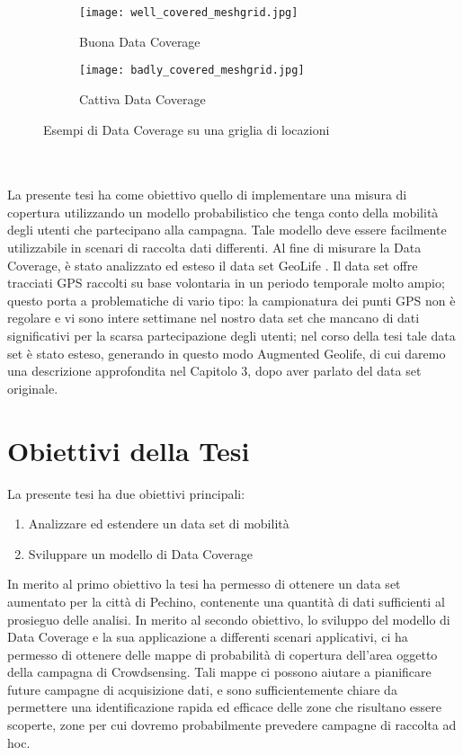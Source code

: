  \begin{figure}[h!]
 	\centering
 	\begin{subfigure}[b]{0.5\linewidth}
 		\texttt{[image: well\_covered\_meshgrid.jpg]}
 		\caption{Buona Data Coverage}
 	\end{subfigure}\hfill
 	\begin{subfigure}[b]{0.5\linewidth}
 		\texttt{[image: badly\_covered\_meshgrid.jpg]}
 		\caption{Cattiva Data Coverage}
 	\end{subfigure}\hfill
 	\caption[Esempio di Data Coverage]{Esempi di Data Coverage su una griglia di locazioni}
 	\label{fig:coverage_examples}
 \end{figure}

\ \\ \\
 
 
La presente tesi ha come obiettivo quello di implementare una misura di copertura utilizzando un modello probabilistico che tenga conto della mobilità degli utenti che partecipano alla campagna.
Tale modello deve essere facilmente utilizzabile in scenari di raccolta dati differenti.
Al fine di misurare la Data Coverage, è stato analizzato ed esteso il data set GeoLife \cite{zheng1,zheng2,zheng3}.
Il data set offre tracciati GPS raccolti su base volontaria in un periodo temporale molto ampio; questo porta a problematiche di vario tipo: la campionatura dei punti GPS non è regolare e vi sono intere settimane nel nostro data set che mancano di dati significativi per la scarsa partecipazione degli utenti; nel corso della tesi tale data set è stato esteso, generando in questo modo Augmented Geolife, di cui daremo una descrizione approfondita nel Capitolo 3, dopo aver parlato del data set originale.

\section*{Obiettivi della Tesi}


La presente tesi ha due obiettivi principali:
\begin{enumerate}
	\item Analizzare ed estendere un data set di mobilità
	\item Sviluppare un modello di Data Coverage
\end{enumerate}

In merito al primo obiettivo la tesi ha permesso di ottenere un data set aumentato per la città di Pechino, contenente una quantità di dati sufficienti al prosieguo delle analisi.
In merito al secondo obiettivo, lo sviluppo del modello di Data Coverage e la sua applicazione a differenti scenari applicativi, ci ha permesso di ottenere delle mappe di probabilità di copertura dell'area oggetto della campagna di Crowdsensing.
Tali mappe ci possono aiutare a pianificare future campagne di acquisizione dati, e sono sufficientemente chiare da permettere una identificazione rapida ed efficace delle zone che risultano essere scoperte, zone per cui dovremo probabilmente prevedere campagne di raccolta ad hoc.

